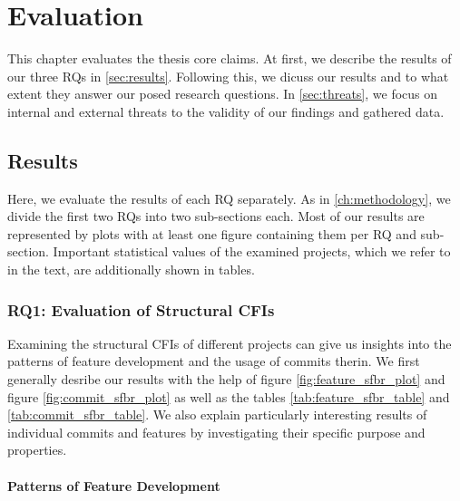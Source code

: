\chapter{Evaluation}\label{ch:evaluation}

This chapter evaluates the thesis core claims.
At first, we describe the results of our three RQs in \autoref{sec:results}.
Following this, we dicuss our results and to what extent they answer our posed research questions.
In \autoref{sec:threats}, we focus on internal and external threats to the validity of our findings and gathered data. 

\section{Results}\label{sec:results}

Here, we evaluate the results of each RQ separately. 
As in \autoref{ch:methodology}, we divide the first two RQs into two sub-sections each.
Most of our results are represented by plots with at least one figure containing them per RQ and sub-section.
Important statistical values of the examined projects, which we refer to in the text, are additionally shown in tables.

\subsection*{\textbf{RQ1: Evaluation of Structural CFIs}}\label{sec:eval_struc_cfis}

Examining the structural CFIs of different projects can give us insights into the patterns of feature development and the usage of commits therin.
We first generally desribe our results with the help of figure \ref{fig:feature_sfbr_plot} and figure \ref{fig:commit_sfbr_plot} as well as the tables \ref{tab:feature_sfbr_table} and \ref{tab:commit_sfbr_table}.
We also explain particularly interesting results of individual commits and features by investigating their specific purpose and properties.

\subsubsection*{Patterns of Feature Development}\label{sec:eval_feature_development}

